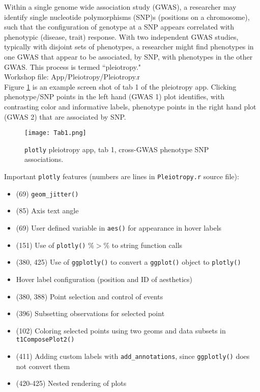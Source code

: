 \documentclass[10pt, letterpaper]{article}
\begin{document}
\begin{spacing}{1.0}
Within a single genome wide association study (GWAS), a researcher may identify single nucleotide polymorphisms (SNP)s (positions on a chromosome), such that the configuration of genotype at a SNP appears correlated with phenotypic (disease, trait) response.  With two independent GWAS studies, typically with disjoint sets of phenotypes, a researcher might find phenotypes in one GWAS that appear to be associated, by SNP, with phenotypes in the other GWAS.  This process is termed ``pleiotropy."\\

Workshop file:  App/Pleiotropy/Pleiotropy.r\\

Figure \ref{fg:tab1} is an example screen shot of tab 1 of the pleiotropy app.  Clicking phenotype/SNP points in the left hand (GWAS 1) plot identifies, with contrasting color and informative labels, phenotype points in the right hand plot (GWAS 2) that are associated by SNP. 

\begin{figure}[H]
    \texttt{[image: Tab1.png]}
    \centering
    \caption{\texttt{plotly} pleiotropy app, tab 1, cross-GWAS phenotype SNP associations.}
    \label{fg:tab1}
\end{figure}


Important \texttt{plotly} features (numbers are lines in \texttt{Pleiotropy.r} source file):

\begin{itemize}
  \item (69) \texttt{geom\_jitter()}
  \item (85) Axis text angle
  \item (69) User defined variable in \texttt{aes()} for appearance in hover labels
  \item (151) Use of \texttt{plotly()} \%$>$\% to string function calls
  \item (380, 425) Use of \texttt{ggplotly()} to convert a \texttt{ggplot()} object to \texttt{plotly()}
  \item Hover label configuration (position and ID of aesthetics)
  \item (380, 388) Point selection and control of events
  \item (396) Subsetting observations for selected point
  \item (102) Coloring selected points using two geoms and data subsets in \texttt{t1ComposePlot2()}
  \item (411) Adding custom labels with \texttt{add\_annotations}, since \texttt{ggplotly()} does not convert them
  \item(420-425) Nested rendering of plots 
\end{itemize}


\end{spacing}
\end{document}

